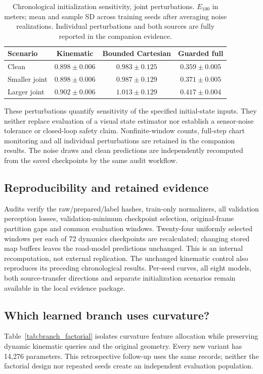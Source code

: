 \documentclass[preprint,12pt]{elsarticle}
\begin{document}
\begin{table}[t]
\centering\small
\caption{Chronological initialization sensitivity, joint perturbations. $E_{100}$ in meters; mean and sample SD across training seeds after averaging noise realizations. Individual perturbations and both sources are fully reported in the companion evidence.}
\label{tab:initialization}
\begin{tabular}{lccc}\toprule
Scenario & Kinematic & Bounded Cartesian & Guarded full \\ \midrule
Clean & $0.898 \pm 0.006$ & $0.983 \pm 0.125$ & $0.359 \pm 0.005$ \\
Smaller joint & $0.898 \pm 0.006$ & $0.987 \pm 0.129$ & $0.371 \pm 0.005$ \\
Larger joint & $0.902 \pm 0.006$ & $1.013 \pm 0.129$ & $0.417 \pm 0.004$ \\
\bottomrule\end{tabular}
\end{table}
These perturbations quantify sensitivity of the specified initial-state inputs.
They neither replace evaluation of a visual state estimator nor establish a
sensor-noise tolerance or closed-loop safety claim. Nonfinite-window counts,
full-step chart monitoring and all individual perturbations are retained in the
companion results. The noise draws and clean predictions are independently
recomputed from the saved checkpoints by the same audit workflow.

\subsection{Reproducibility and retained evidence}
Audits verify the raw/prepared/label hashes, train-only normalizers, all validation
perception losses, validation-minimum checkpoint selection, original-frame
partition gaps and common evaluation windows. Twenty-four uniformly selected
windows per each of 72 dynamics checkpoints are recalculated; changing stored
map buffers leaves the road-model predictions unchanged. This is an internal
recomputation, not external replication. The unchanged kinematic control also
reproduces its preceding chronological results. Per-seed curves, all eight
models, both source-transfer directions and separate initialization scenarios
remain available in the local evidence package.

\subsection{Which learned branch uses curvature?}\label{sec:branch_results}
Table~\ref{tab:branch_factorial} isolates curvature feature allocation while
preserving dynamic kinematic queries and the original geometry. Every new
variant has 14,276 parameters. This retrospective follow-up uses the same
records; neither the factorial design nor repeated seeds create an independent
evaluation population.
\end{document}
